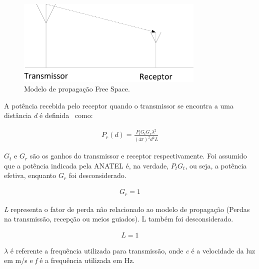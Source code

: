 \begin{figure}[htb]
\centering
\includegraphics[width=0.8\textwidth]{figs/freespaces}
\caption[Modelo de propagação Free Space.]
{Modelo de propagação Free Space.}
\label{fig:freespaces}
\end{figure}

A potência recebida pelo receptor quando o transmissor se encontra a uma distância \textit{d} é definida~\cite{rapapport} como: 

\begin{align}
  \label{potfree} P_r(d) =\frac{ P_tG_tG_r\lambda^{2}}{(4\pi)^{2}d^{2}L}
\end{align}

\begin{math}G_t\end{math} e \begin{math}G_r\end{math} são os ganhos do transmissor e receptor respectivamente. Foi assumido que a potência indicada pela ANATEL é, na verdade, \begin{math}P_tG_t\end{math}, ou seja, a potência efetiva, enquanto \begin{math}G_r\end{math} foi desconsiderado.

\begin{align}
  \label{ganho} G_r = 1
\end{align}

\textit{L} representa o fator de perda não relacionado ao modelo de propagação (Perdas na transmissão, recepção ou meios guiados). L também foi desconsiderado.

\begin{align}
  \label{loss} L = 1
\end{align}

\begin{math}\lambda\end{math} é referente a frequência utilizada para transmissão, onde \textit{c} é a velocidade da luz em m/s e \textit{f} é a frequência utilizada em Hz.

